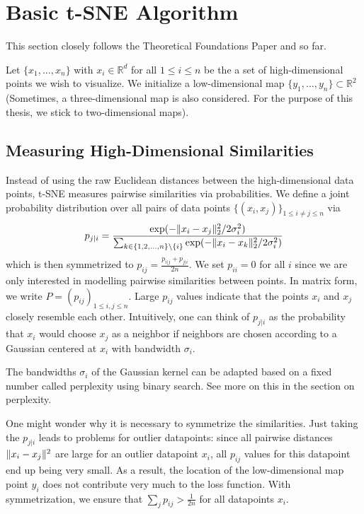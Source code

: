 \section{Basic t-SNE Algorithm}
This section closely follows the Theoretical Foundations Paper \cite{JMLR:v23:21-0524} and \cite{vdMaa08} so far. 

Let $\{x_1, \dots , x_n \}$ with $x_i \in \mathbb{R}^d$ for all $1 \leq i \leq n$ be the a set of high-dimensional points we wish to visualize.
We initialize a low-dimensional map $\{y_1, \dots , y_n\} \subset \mathbb{R}^2$ (Sometimes, a three-dimensional map is also considered. For the purpose of this thesis, we stick to two-dimensional maps). 

\subsection{Measuring High-Dimensional Similarities}

Instead of using the raw Euclidean distances between the high-dimensional data points, t-SNE measures pairwise similarities via probabilities. 
We define a joint probability distribution over all pairs of data points $\{(x_i, x_j)\}_{1 \leq i \neq j \leq n}$ via  
\begin{equation}
    p_{j|i} =  \frac{\exp(-\lVert x_i - x_j\rVert_2^2 / 2\sigma_i^2)}{\sum_{k \in \{1,2, \dots, n\} \backslash \{i\}} \exp({-\lVert x_i - x_k\rVert_2^2 / 2 \sigma_i^2})}
\end{equation}
which is then symmetrized to $p_{ij} = \frac{p_{i|j} + p_{j|i}}{2n}$. We set $p_{ii}=0$ for all $i$ since we are only interested in modelling pairwise similarities between points. In matrix form, we write $P = (p_{ij})_{1 \leq i, j \leq n}$. 
Large $p_{ij}$ values indicate that the points $x_i$ and $x_j$ closely resemble each other. 
Intuitively, one can think of $p_{j|i}$ as the probability that $x_i$ would choose $x_j$ as a neighbor if neighbors are chosen according to a Gaussian centered at $x_i$ with bandwidth $\sigma_i$. 

The bandwidths $\sigma_i$ of the Gaussian kernel can be adapted based on a fixed number called perplexity using binary search. See more on this in the section on perplexity. 

One might wonder why it is necessary to symmetrize the similarities. Just taking the $p_{j|i}$ leads to problems for outlier datapoints: since all pairwise distances $\lVert x_i - x_j\rVert^2$ are large for an outlier datapoint $x_i$, all $p_{ij}$ values for this datapoint end up being very small. 
As a result, the location of the low-dimensional map point $y_i$ does not contribute very much to the loss function. With symmetrization, we ensure that $\sum_{j} p_{ij} > \frac{1}{2n}$ for all datapoints $x_i$. 

